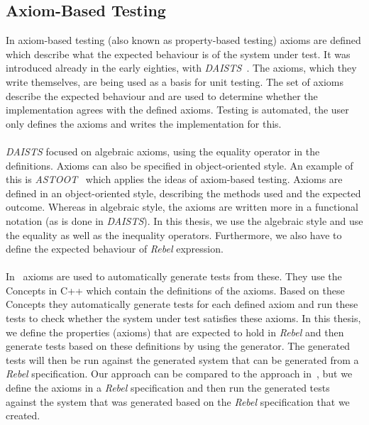 \subsection{Axiom-Based Testing}
In axiom-based testing (also known as property-based testing) axioms are defined which describe what the expected behaviour is of the system under test. It was introduced already in the early eighties, with \textit{DAISTS}~\cite{gannon1981data}. The axioms, which they write themselves, are being used as a basis for unit testing. The set of axioms describe the expected behaviour and are used to determine whether the implementation agrees with the defined axioms. Testing is automated, the user only defines the axioms and writes the implementation for this.\\
\\
\textit{DAISTS} focused on algebraic axioms, using the equality operator in the definitions. Axioms can also be specified in object-oriented style. An example of this is \textit{ASTOOT}~\cite{doong1994astoot} which applies the ideas of axiom-based testing. Axioms are defined in an object-oriented style, describing the methods used and the expected outcome. Whereas in algebraic style, the axioms are written more in a functional notation (as is done in \textit{DAISTS}). In this thesis, we use the algebraic style and use the equality as well as the inequality operators. Furthermore, we also have to define the expected behaviour of \textit{Rebel} expression.\\
\\
In~\cite{bagge2010axioms} axioms are used to automatically generate tests from these. They use the Concepts in C++ which contain the definitions of the axioms. Based on these Concepts they automatically generate tests for each defined axiom and run these tests to check whether the system under test satisfies these axioms. In this thesis, we define the properties (axioms) that are expected to hold in \textit{Rebel} and then generate tests based on these definitions by using the generator. The generated tests will then be run against the generated system that can be generated from a \textit{Rebel} specification. Our approach can be compared to the approach in~\cite{bagge2010axioms}, but we define the axioms in a \textit{Rebel} specification and then run the generated tests against the system that was generated based on the \textit{Rebel} specification that we created.

